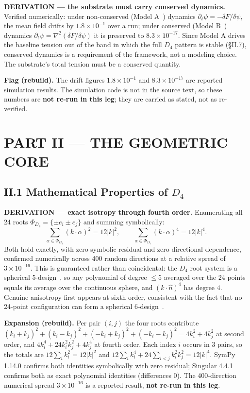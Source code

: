 \documentclass[11pt,a4paper]{article}
\newcommand{\expansion}[1]{\par\smallskip\noindent\textbf{Expansion (rebuild).} #1\par\smallskip}
\newcommand{\flagbox}[1]{\par\smallskip\noindent\textbf{Flag (rebuild).} #1\par\smallskip}
\begin{document}
\textbf{DERIVATION --- the substrate must carry conserved dynamics.} Verified numerically: under non-conserved (Model A~\cite{hohenberg1977}) dynamics $\partial_t\psi = -\delta F/\delta\psi$, the mean field drifts by $1.8 \times 10^{-1}$ over a run; under conserved (Model B~\cite{hohenberg1977}) dynamics $\partial_t\psi = \nabla^2(\delta F/\delta\psi)$ it is preserved to $8.3 \times 10^{-17}$. Since Model A drives the baseline tension out of the band in which the full $D_4$ pattern is stable (\S II.7), conserved dynamics is a requirement of the framework, not a modeling choice. The substrate's total tension must be a conserved quantity.
\flagbox{The drift figures $1.8\times10^{-1}$ and $8.3\times10^{-17}$ are reported simulation results. The simulation code is not in the source text, so these numbers are \textbf{not re-run in this leg}; they are carried as stated, not as re-verified.}

\section{PART II --- THE GEOMETRIC CORE}

\subsection{II.1 Mathematical Properties of $D_4$}
\textbf{DERIVATION --- exact isotropy through fourth order.} Enumerating all 24 roots $\Phi_{D_4} = \{\pm e_i \pm e_j\}$ and summing symbolically:
\begin{equation}
\sum_{\alpha \in \Phi_{D_4}} (k \cdot \alpha)^2 = 12|k|^2,
\qquad
\sum_{\alpha \in \Phi_{D_4}} (k \cdot \alpha)^4 = 12|k|^4.
\end{equation}
Both hold exactly, with zero symbolic residual and zero directional dependence, confirmed numerically across 400 random directions at a relative spread of $3 \times 10^{-16}$. This is guaranteed rather than coincidental: the $D_4$ root system is a spherical 5-design~\cite{delsarte1977}, so any polynomial of degree $\leq 5$ averaged over the 24 points equals its average over the continuous sphere, and $(k\cdot\hat{n})^4$ has degree 4. Genuine anisotropy first appears at sixth order, consistent with the fact that no 24-point configuration can form a spherical 6-design~\cite{delsarte1977}.

\expansion{Per pair $(i,j)$ the four roots contribute $(k_i+k_j)^2 + (k_i-k_j)^2 + (-k_i+k_j)^2 + (-k_i-k_j)^2 = 4k_i^2 + 4k_j^2$ at second order, and $4k_i^4 + 24k_i^2k_j^2 + 4k_j^4$ at fourth order. Each index $i$ occurs in 3 pairs, so the totals are $12\sum_i k_i^2 = 12|k|^2$ and $12\sum_i k_i^4 + 24\sum_{i<j} k_i^2k_j^2 = 12|k|^4$. SymPy 1.14.0 confirms both identities symbolically with zero residual; Singular 4.4.1 confirms both as exact polynomial identities (differences $0$). The 400-direction numerical spread $3\times10^{-16}$ is a reported result, \textbf{not re-run in this leg}.}
\end{document}

